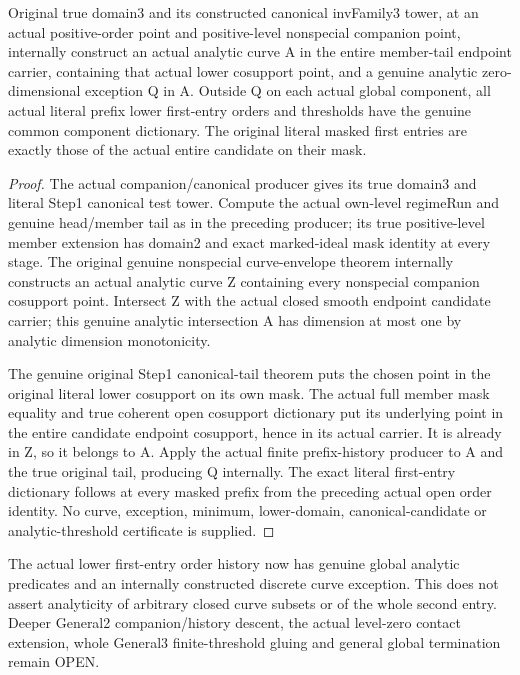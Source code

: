 \begin{theorem}
\label{hir:member-lower-order-actual-general-three-consumer}
\leanok
Original true domain3 and its constructed canonical invFamily3 tower, at an
actual positive-order point and positive-level nonspecial companion point,
internally construct an actual analytic curve A in the entire member-tail
endpoint carrier, containing that actual lower cosupport point, and a genuine
analytic zero-dimensional exception Q in A. Outside Q on each actual global
component, all actual literal prefix lower first-entry orders and thresholds
have the genuine common component dictionary. The original literal masked
first entries are exactly those of the actual entire candidate on their mask.
\end{theorem}
\begin{proof}
The actual companion/canonical producer gives its true domain3 and literal
Step1 canonical test tower. Compute the actual own-level regimeRun and genuine
head/member tail as in the preceding producer; its true positive-level member
extension has domain2 and exact marked-ideal mask identity at every stage.
The original genuine nonspecial curve-envelope theorem internally constructs
an actual analytic curve Z containing every nonspecial companion cosupport
point. Intersect Z with the actual closed smooth endpoint candidate carrier;
this genuine analytic intersection A has dimension at most one by analytic
dimension monotonicity.

The genuine original Step1 canonical-tail theorem puts the chosen point in
the original literal lower cosupport on its own mask. The actual full member
mask equality and true coherent open cosupport dictionary put its underlying
point in the entire candidate endpoint cosupport, hence in its actual carrier.
It is already in Z, so it belongs to A. Apply the actual finite prefix-history
producer to A and the true original tail, producing Q internally. The exact
literal first-entry dictionary follows at every masked prefix from the preceding
actual open order identity. No curve, exception, minimum, lower-domain,
canonical-candidate or analytic-threshold certificate is supplied.
\end{proof}

\begin{remark}
The actual lower first-entry order history now has genuine global analytic
predicates and an internally constructed discrete curve exception. This does
not assert analyticity of arbitrary closed curve subsets or of the whole
second entry. Deeper General2 companion/history descent, the actual level-zero
contact extension, whole General3 finite-threshold gluing and general global
termination remain OPEN.
\end{remark}
